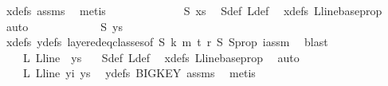 \begin{isabellebody}
\ xdefs\ assms{\isacharparenleft}{\kern0pt}{}{\isacharparenright}{\kern0pt}\ \isamarkupfalse%
\ metis\isanewline
\ \ \ \ \ \ \isamarkupfalse%
\ \isamarkupfalse%
\ {\isachardoublequoteopen}\ {\isachardot}{\kern0pt}{\isachardot}{\kern0pt}{\isachardot}{\kern0pt}\ {\isacharequal}{\kern0pt}\ \ {\isasymchi}S\ xs{\isachardoublequoteclose}\ \isamarkupfalse%
\ {\isasymchi}S{\isacharunderscore}{\kern0pt}def\ {\isasymchi}L{\isacharunderscore}{\kern0pt}def\ \isamarkupfalse%
\ xdefs\ L{\isacharunderscore}{\kern0pt}line{\isacharunderscore}{\kern0pt}base{\isacharunderscore}{\kern0pt}prop\ \isamarkupfalse%
\ auto\isanewline
\ \ \ \ \ \ \isamarkupfalse%
\ \isamarkupfalse%
\ {\isachardoublequoteopen}\ {\isachardot}{\kern0pt}{\isachardot}{\kern0pt}{\isachardot}{\kern0pt}\ {\isacharequal}{\kern0pt}\ {\isasymchi}S\ ys{\isachardoublequoteclose}\ \isamarkupfalse%
\ xdefs\ ydefs\ layered{\isacharunderscore}{\kern0pt}eq{\isacharunderscore}{\kern0pt}classes{\isacharbrackleft}{\kern0pt}of\ S\ k\ m\ t\ r\ {\isasymchi}S{\isacharbrackright}{\kern0pt}\ S{\isacharunderscore}{\kern0pt}prop\ i{\isacharunderscore}{\kern0pt}assm\ \isamarkupfalse%
\ blast\isanewline
\ \ \ \ \ \ \isamarkupfalse%
\ \isamarkupfalse%
\ {\isachardoublequoteopen}\ {\isachardot}{\kern0pt}{\isachardot}{\kern0pt}{\isachardot}{\kern0pt}\ {\isacharequal}{\kern0pt}\ {\isasymchi}L\ {\isacharparenleft}{\kern0pt}L{\isacharunderscore}{\kern0pt}line\ {}{\isacharparenright}{\kern0pt}\ ys{\isachardoublequoteclose}\ \ \isamarkupfalse%
\ {\isasymchi}S{\isacharunderscore}{\kern0pt}def\ {\isasymchi}L{\isacharunderscore}{\kern0pt}def\ \isamarkupfalse%
\ xdefs\ L{\isacharunderscore}{\kern0pt}line{\isacharunderscore}{\kern0pt}base{\isacharunderscore}{\kern0pt}prop\ \isamarkupfalse%
\ auto\isanewline
\ \ \ \ \ \ \isamarkupfalse%
\ \isamarkupfalse%
\ {\isachardoublequoteopen}\ {\isachardot}{\kern0pt}{\isachardot}{\kern0pt}{\isachardot}{\kern0pt}\ {\isacharequal}{\kern0pt}\ {\isasymchi}L\ {\isacharparenleft}{\kern0pt}L{\isacharunderscore}{\kern0pt}line\ yi{\isacharparenright}{\kern0pt}\ ys{\isachardoublequoteclose}\ \isamarkupfalse%
\ ydefs\ BIGKEY\ assms{\isacharparenleft}{\kern0pt}{}{\isacharparenright}{\kern0pt}\ \isamarkupfalse%
\ metis\isanewline
\ \ \ \ \ \ \isamarkupfalse%

\end{isabellebody}
